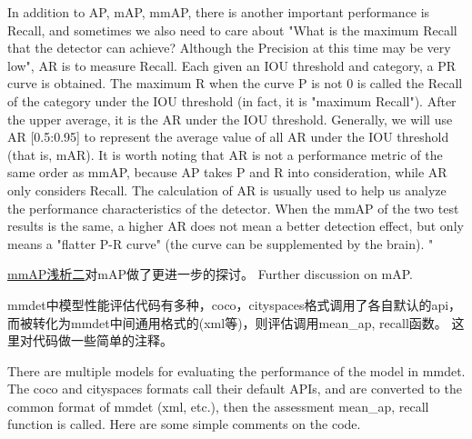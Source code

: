 \documentclass[UTF8]{ctexart}
\begin{document}
In addition to AP, mAP, mmAP, there is another important performance is Recall, and sometimes we also need to care 
about "What is the maximum Recall that the detector can achieve? Although the Precision at this time may be very low", 
AR is to measure Recall. Each given an IOU threshold and category, a PR curve is obtained. The maximum R when the curve P 
is not 0 is called the Recall of the category under the IOU threshold (in fact, it is "maximum Recall"). After the upper average, 
it is the AR under the IOU threshold. Generally, we will use AR [0.5:0.95] to represent the average value of all AR under the IOU 
threshold (that is, mAR). It is worth noting that AR is not a performance metric of the same order as mmAP, because AP takes P 
and R into consideration, while AR only considers Recall. The calculation of AR is usually used to help us analyze the performance 
characteristics of the detector. When the mmAP of the two test results is the same, a higher AR does not mean a better detection 
effect, but only means a "flatter P-R curve" (the curve can be supplemented by the brain).
"

\href{https://zhuanlan.zhihu.com/p/56899189}{mmAP浅析二}对mAP做了更进一步的探讨。
Further discussion on mAP.


mmdet中模型性能评估代码有多种，coco，cityspaces格式调用了各自默认的api，而被转化为mmdet中间通用格式的(xml等)，则评估调用mean\_ap, recall函数。
这里对代码做一些简单的注释。

There are multiple models for evaluating the performance of the model in mmdet. The coco and cityspaces formats call 
their default APIs, and are converted to the common format of mmdet (xml, etc.), then the assessment mean\_ap, recall 
function is called. Here are some simple comments on the code.
\end{document}

